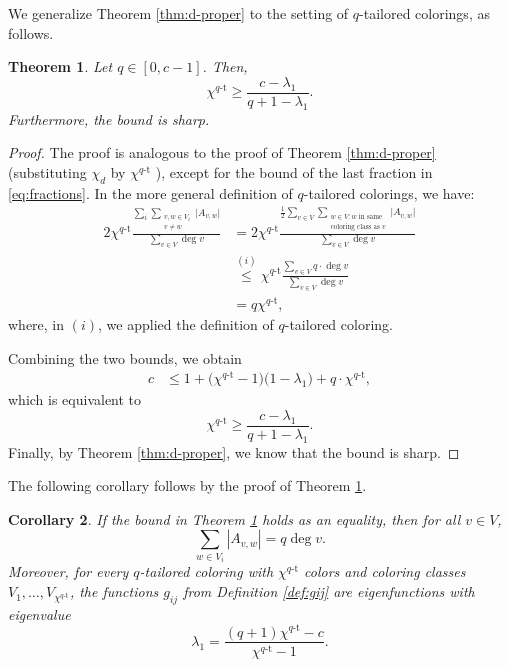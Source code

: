 \documentclass{article}
\theoremstyle{plain}
\newtheorem{theorem}{Theorem}[section]
\newtheorem{corollary}[theorem]{Corollary}
\theoremstyle{definition}
\theoremstyle{remark}
\begin{document}
We generalize Theorem \ref{thm:d-proper} to the setting of $q$-tailored colorings, as follows.


\begin{theorem}\label{thm:q-tailored}
    Let $q\in [0,c-1]$. Then,
    \[
    \chi^{q\text{-t}} \geq \frac{c-\lambda_1}{q+1-\lambda_1}.
    \]
    Furthermore, the bound is sharp.
\end{theorem}
\begin{proof}
    The proof is analogous to the proof of Theorem \ref{thm:d-proper} (substituting $\chi_d$ by $\chi^{q\text{-t}}$ ), except for the bound of the last fraction in \eqref{eq:fractions}. In the more general definition of $q$-tailored colorings, we have:
    \begin{align*}
        2\chi^{q\text{-t}}\frac{\sum_i\sum_{\substack{v,w\in V_i\\ v\neq w}}\bigl| A_{v,w}\bigr|}{\sum_{v\in V}\deg v}
        &= 2\chi^{q\text{-t}}\frac{\frac12 \sum_{v\in V}\sum_{\substack{w\in V\colon w \text{ in same}\\ \text{coloring class as $v$}}}\bigl|A_{v,w}\bigr|}{\sum_{v\in V}\deg v}\\
        &\overset{(i)}{\leq} \chi^{q\text{-t}} \frac{\sum_{v\in V}q\cdot \deg v}{\sum_{v\in V}\deg v}\\
        &=q\chi^{q\text{-t}},
    \end{align*}
    where, in $(i)$, we applied the definition of $q$-tailored coloring.
    
    Combining the two bounds, we obtain
    \begin{align*}
        c 
        &\leq 1 + \bigl(\chi^{q\text{-t}}-1\bigr)\bigl(1- \lambda_{1}\bigr) + q\cdot\chi^{q\text{-t}},
    \end{align*}
    which is equivalent to
    \[
    \chi^{q\text{-t}} \geq \frac{c-\lambda_1}{q+1-\lambda_1}.
    \]
    Finally, by Theorem \ref{thm:d-proper}, we know that the bound is sharp.
\end{proof}
The following corollary follows by the proof of Theorem \ref{thm:q-tailored}.
\begin{corollary}\label{cor:q-tailored}
  If the bound in Theorem \ref{thm:q-tailored} holds as an equality, then for all $v\in V$,    
    \[
    \sum_{w\in V_i}|A_{v,w}| = q \deg v.
    \]
    Moreover, for every $q$-tailored coloring with $\chi^{q\text{-t}}$ colors and coloring classes $V_1,\ldots,V_{\chi^{q\text{-t}}}$, the functions $g_{ij}$ from Definition \ref{def:gij} are eigenfunctions with eigenvalue
    \[
    \lambda_1 = \frac{(q+1)\chi^{q\text{-t}}-c}{\chi^{q\text{-t}}-1}.
    \]
\end{corollary}
\end{document}
